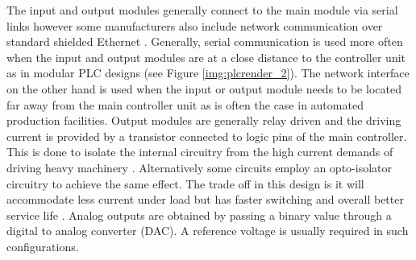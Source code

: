 The input and output modules generally connect to the main module via serial links 
however some manufacturers also include network communication over standard shielded 
Ethernet \cite{rockwell_io,rockwell_tech_pub}. Generally, serial communication is used 
more often when the input and output modules are at a close distance to the controller 
unit as in modular PLC designs  (see Figure \ref{img:plcrender_2}). The network 
interface on the other hand is used when the input or output module needs to be located 
far away from the main controller unit \cite{rockwell_tech_pub} as is often the case in 
automated production facilities. Output modules are generally relay driven and the 
driving current is provided by a transistor connected to logic pins of the main controller.
This is done to isolate the internal circuitry from the high current demands of 
driving heavy machinery \cite{plcapp}. Alternatively some circuits employ an opto-isolator 
circuitry to achieve the same effect. The trade off in this design is it will accommodate 
less current under load but has faster switching and overall better service life \cite{plcapp}.
Analog outputs are obtained by passing a binary value through a digital to analog 
converter (DAC). A reference voltage is usually required in such configurations.

